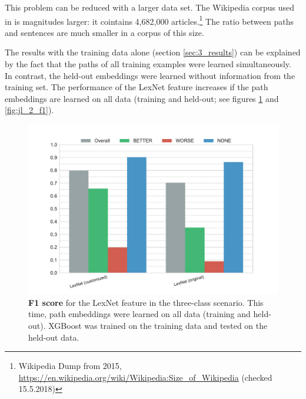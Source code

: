 This problem can be reduced with a larger data set. The Wikipedia corpus used in \cite{DBLP:conf/acl/ShwartzGD16} is magnitudes larger: it cointains 4,682,000 articles.\footnote{Wikipedia Dump from 2015, \url{https://en.wikipedia.org/wiki/Wikipedia:Size_of_Wikipedia} (checked 15.5.2018)} The ratio between paths and sentences are much smaller in a corpus of this size.

The results with the training data alone (section \ref{sec:3_results}) can be explained by the fact that the paths of all training examples were learned simultaneously. In contrast, the held-out embeddings were learned without information from the training set. The performance of the LexNet feature increases if the path embeddings are learned on all data (training and held-out; see figures \ref{fig:jl_3_f1} and  \ref{fig:jl_2_f1}).


\begin{figure}[htbp]
         \caption{\textbf{F1 score} for the LexNet feature in the three-class scenario. This time, path embeddings were learned on all data (training and held-out). XGBoost was trained on the training data and tested on the held-out data.} 
    \label{fig:jl_3_f1}
    \centering
	\includegraphics[width=1\linewidth]{images/extra/jl-f1-False}
    \end{figure}
    
